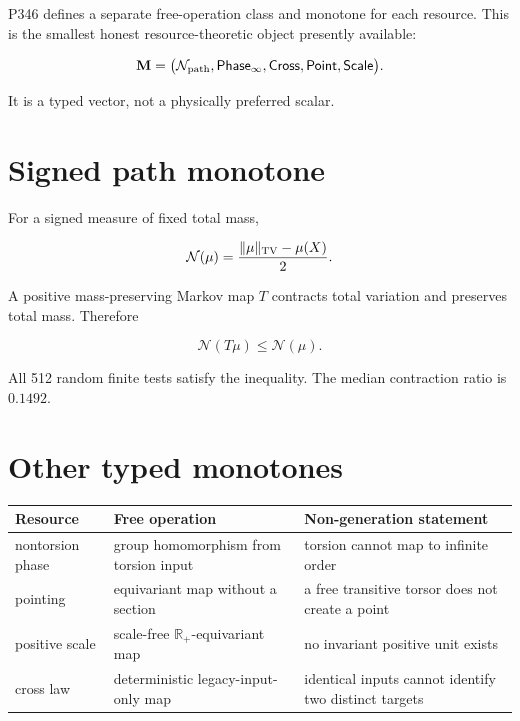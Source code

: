 \documentclass[11pt,a4paper,openany]{report}
\begin{document}
P346 defines a separate free-operation class and monotone for each resource. This is the smallest honest resource-theoretic object presently available:

\[
\mathbf M=
\big(
\mathcal N_{\rm path},
\mathsf{Phase}_\infty,
\mathsf{Cross},
\mathsf{Point},
\mathsf{Scale}
\big).
\]

It is a typed vector, not a physically preferred scalar.

\section{Signed path monotone}

For a signed measure of fixed total mass,

\[
\mathcal N(\mu)=
\frac{\|\mu\|_{\rm TV}-\mu(X)}{2}.
\]

A positive mass-preserving Markov map \(T\) contracts total variation and preserves total mass. Therefore

\[
\mathcal N(T\mu)\leq\mathcal N(\mu).
\]

All 512 random finite tests satisfy the inequality. The median contraction ratio is \(0.1492\).

\section{Other typed monotones}

\begin{center}
\begingroup\small
\setlength{\tabcolsep}{2.5pt}
\renewcommand{\arraystretch}{1.16}
\begin{longtable}{@{}p{}p{}p{}@{}}
\toprule
\textbf{Resource} & \textbf{Free operation} & \textbf{Non-generation statement} \\
\midrule
\endhead
nontorsion phase & group homomorphism from torsion input & torsion cannot map to infinite order \\
pointing & equivariant map without a section & a free transitive torsor does not create a point \\
positive scale & scale-free \(\mathbb R_+\)-equivariant map & no invariant positive unit exists \\
cross law & deterministic legacy-input-only map & identical inputs cannot identify two distinct targets \\
\bottomrule
\end{longtable}
\endgroup
\end{center}
\end{document}
